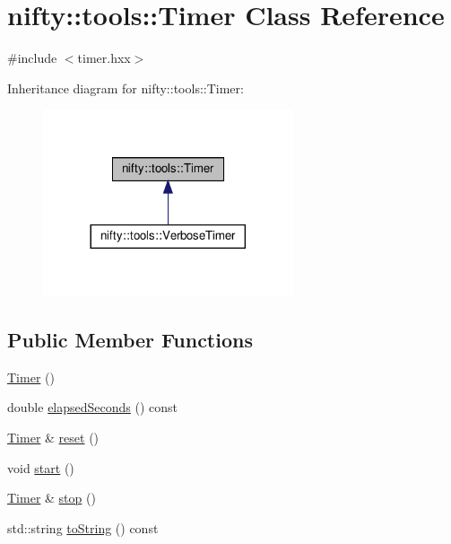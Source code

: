 \hypertarget{classnifty_1_1tools_1_1Timer}{}\section{nifty\+:\+:tools\+:\+:Timer Class Reference}
\label{classnifty_1_1tools_1_1Timer}


{\ttfamily \#include $<$timer.\+hxx$>$}



Inheritance diagram for nifty\+:\+:tools\+:\+:Timer\+:
\nopagebreak
\begin{figure}[H]
\begin{center}
\leavevmode
\includegraphics[width=209pt]{classnifty_1_1tools_1_1Timer__inherit__graph}
\end{center}
\end{figure}
\subsection*{Public Member Functions}
\begin{DoxyCompactItemize}
\item 
\hyperlink{classnifty_1_1tools_1_1Timer_afcb5547e9eb4e28f853f1719a8441f13}{Timer} ()
\item 
double \hyperlink{classnifty_1_1tools_1_1Timer_a8503fcdb305528e56bd06076ee854df5}{elapsed\+Seconds} () const
\item 
\hyperlink{classnifty_1_1tools_1_1Timer}{Timer} \& \hyperlink{classnifty_1_1tools_1_1Timer_a6cfa990f8398a8dfd00810d3b0d6f526}{reset} ()
\item 
void \hyperlink{classnifty_1_1tools_1_1Timer_a0167833955c7125f150098b40bd9cdff}{start} ()
\item 
\hyperlink{classnifty_1_1tools_1_1Timer}{Timer} \& \hyperlink{classnifty_1_1tools_1_1Timer_ac45248ef59cb5b742566fde4f64ddada}{stop} ()
\item 
std\+::string \hyperlink{classnifty_1_1tools_1_1Timer_afd3767420c4c3dc2b20a87684d5b86df}{to\+String} () const
\end{DoxyCompactItemize}


